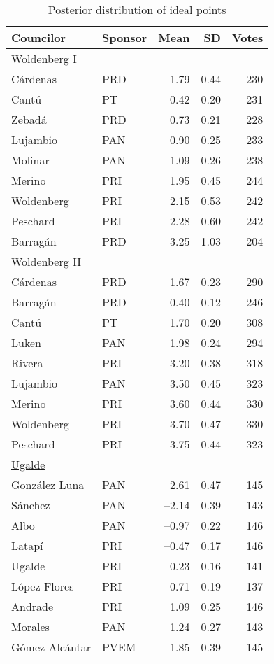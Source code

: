 \documentclass[12 pt, letter]{article}
\begin{document}
\begin{table}
\caption{Posterior distribution of ideal points}\label{T:idealpoints}
\begin{center}
\begin{tabular}{llrrr}
\hline
 Councilor   &  Sponsor  &    Mean    & SD & Votes\\ \hline
\multicolumn{5}{l}{\underline{Woldenberg I}}   \\ [1.5ex]
C\'ardenas        & PRD &--1.79  &   0.44 & 230\\
Cant\'u           & PT  &  0.42  &   0.20 & 231\\
Zebad\'a          & PRD &  0.73  &   0.21 & 228\\
Lujambio          & PAN &  0.90  &   0.25 & 233\\
Molinar           & PAN &  1.09  &   0.26 & 238\\
Merino            & PRI &  1.95  &   0.45 & 244\\
Woldenberg        & PRI &  2.15  &   0.53 & 242\\
Peschard          & PRI &  2.28  &   0.60 & 242\\
Barrag\'an        & PRD &  3.25  &   1.03 & 204\\ [1ex]
\multicolumn{5}{l}{\underline{Woldenberg II}}  \\ [1.5ex]
C\'ardenas        & PRD &--1.67  &   0.23 & 290\\
Barrag\'an        & PRD &  0.40  &   0.12 & 246\\
Cant\'u           & PT  &  1.70  &   0.20 & 308\\
Luken             & PAN &  1.98  &   0.24 & 294\\
Rivera            & PRI &  3.20  &   0.38 & 318\\
Lujambio          & PAN &  3.50  &   0.45 & 323\\
Merino            & PRI &  3.60  &   0.44 & 330\\
Woldenberg        & PRI &  3.70  &   0.47 & 330\\
Peschard          & PRI &  3.75  &   0.44 & 323\\ [1ex]
\multicolumn{5}{l}{\underline{Ugalde}}         \\ [1.5ex]
Gonz\'alez Luna   & PAN &--2.61  &   0.47 & 145\\
S\'anchez         & PAN &--2.14  &   0.39 & 143\\
Albo              & PAN &--0.97  &   0.22 & 146\\
Latap\'i          & PRI &--0.47  &   0.17 & 146\\
Ugalde            & PRI &  0.23  &   0.16 & 141\\
L\'opez Flores    & PRI &  0.71  &   0.19 & 137\\
Andrade           & PRI &  1.09  &   0.25 & 146\\
Morales           & PAN &  1.24  &   0.27 & 143\\
G\'omez Alc\'antar& PVEM&  1.85  &   0.39 & 145\\ \hline
\end{tabular}
\end{center}
\end{table}
\end{document}
